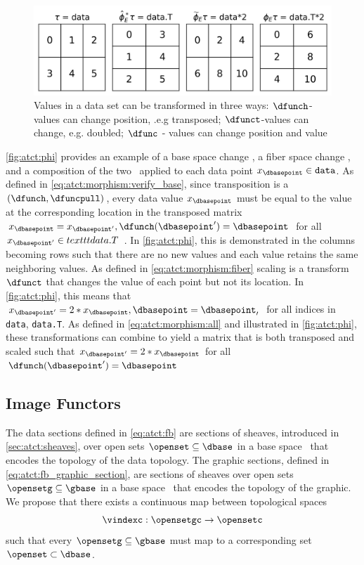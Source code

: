 \documentclass[10pt,journal,compsoc]{IEEEtran}
\theoremstyle{definition}
\theoremstyle{remark}
\begin{document}
\begin{figure}[h!]
  \label{fig:atct:phi}
  \includegraphics[width=\columnwidth]{phi.png}
  \caption{Values in a data set can be transformed in three ways: $\dfunch$-values can change position, .e.g transposed;  $\dfunct$-values can change, e.g. doubled; $\dfunc$ - values can change position and value}
\end{figure}
\autoref{fig:atct:phi} provides an example of a base space change \dfunch, a fiber space change \dfunct, and a composition of the two \dfunc\ applied to each data point $x_{\dbasepoint} \in \texttt{data}$. As defined in \autoref{eq:atct:morphism:verify_base}, 
since transposition is a $(\dfunch, \dfuncpull)$, every data value $x_{\dbasepoint}$ must be equal to the value at the corresponding location in the transposed matrix $x_{\dbasepoint} = x_{\dbasepoint^{\prime}}, \dfunch(\dbasepoint^{\prime}) = \dbasepoint$ for all $x_{\dbasepoint^{\prime}} \in texttt{data.T}$ . In \autoref{fig:atct:phi}, this is demonstrated in the columns becoming rows such that there are no new values and each value retains the same neighboring values. As defined in \autoref{eq:atct:morphism:fiber} scaling is a transform $\dfunct$ that changes the value of each point but not its location. In \autoref{fig:atct:phi}, this means that $x_{\dbasepoint^{\prime}}= 2*x_{\dbasepoint}, \dbasepoint = \dbasepoint_{\prime}$ for all indices in \texttt{data}, \texttt{data.T}. As defined in \autoref{eq:atct:morphism:all} and illustrated in \autoref{fig:atct:phi}, these transformations can combine to yield a matrix that is both transposed and scaled such that $x_{\dbasepoint^{\prime}} = 2*x_{\dbasepoint}$ for all  
$\dfunch(\dbasepoint^{\prime}) = \dbasepoint$

\subsection{Image Functors}
\label{sec:atct:xi}
The data sections defined in \autoref{eq:atct:fb} are sections of sheaves, introduced in \autoref{sec:atct:sheaves}, over open sets $\openset \subseteq \dbase$ in a base space \dbase\ that encodes the topology of the data topology. The graphic sections, defined in \autoref{eq:atct:fb_graphic_section}, are sections of sheaves over open sets $\opensetg \subseteq \gbase$ in a base space \gbase\ that encodes the topology of the graphic. We propose that there exists a continuous \textcolor{functor}{map between topological spaces} \vindexc 
\begin{equation}
  \label{eq:atct:xi}
  \vindexc: \opensetgc \rightarrow \opensetc 
\end{equation}
such that every $\opensetg \subseteq \gbase$ must map to a corresponding set $\openset \subset \dbase$. 
\end{document}
